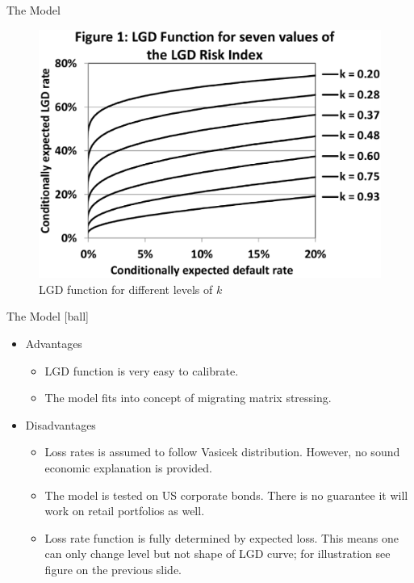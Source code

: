 \documentclass{beamer}
\begin{document}
\begin{frame}{The Model}
\begin{figure}[htp]
\centering
\includegraphics[scale = 0.20]{pictures/lgd-function.eps}
\caption{LGD function for different levels of $k$}
\label{lgd-function}
\end{figure}
\end{frame}

\begin{frame}{The Model}
[ball]
\begin{itemize}
	\item Advantages
		\begin{itemize}
			\item LGD function is very easy to calibrate.
			\item The model fits into concept of migrating matrix stressing.
		\end{itemize}
	\item Disadvantages
		\begin{itemize}
			\item Loss rates is assumed to follow Vasicek distribution. However, no sound economic explanation is provided.
			\item The model is tested on US corporate bonds. There is no guarantee it will work on retail portfolios as well.
			\item Loss rate function is fully determined by expected loss. This means one can only change level but not shape of LGD curve; for illustration see figure on the previous slide.
		\end{itemize}
\end{itemize}
\end{frame}
\end{document}
